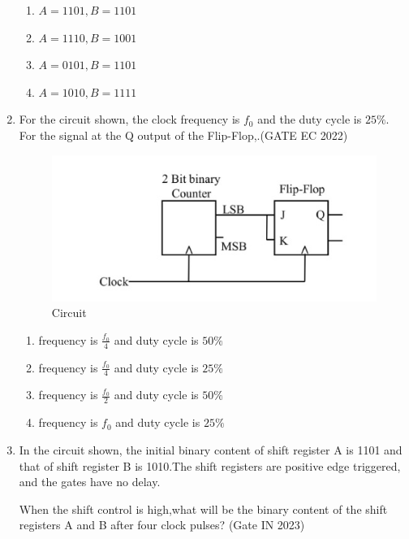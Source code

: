 \begin{enumerate}
\begin{enumerate}
\item $A= 1101,B=1101$
\item $A=1110 ,B=1001$
\item $A=0101 ,B=1101$
\item $A=1010 ,B=1111$
\end {enumerate}
\item For the circuit shown, the clock frequency is $f_0$ and the duty cycle is $25\%$. For the signal at the Q output of the Flip-Flop,\underline{\hspace{20pt}}.\hfill(GATE EC 2022)
		\begin{figure}[H]
			\centering
			\includegraphics[width=\columnwidth]{ide/7474/figs/gate_image_new.jpg}
			\caption{Circuit}
			\label{fig:new_gate}
		\end{figure}
			\begin{enumerate}
			\item frequency is $\frac{{f_0}}{4}$ and duty cycle is $50\%$
			\item frequency is $\frac{{f_0}}{4}$ and duty cycle is $25\%$
			\item frequency is $\frac{{f_0}}{2}$ and duty cycle is $50\%$
			\item frequency is ${f_0}$ and duty cycle is $25\%$
		\end{enumerate}
\item In the circuit shown, the initial binary content of shift register A is 1101 and that of shift register B is 1010.The shift registers are positive edge triggered, and the gates have no delay.

When the shift control is high,what will be the binary content of the shift registers A and B after four clock pulses?
\hfill{(Gate IN 2023)}


\end{enumerate}
